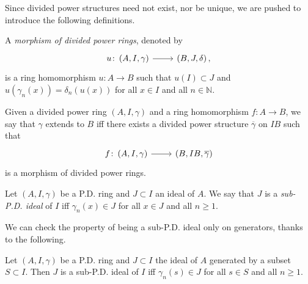 \noindent
Since divided power structures need not exist, nor be unique, we are pushed to
introduce the following definitions.
\begin{defn}
	A \emph{morphism of divided power rings}, denoted by
	\begin{equation*}
	\begin{tikzcd}[row sep = 0ex
		,/tikz/column 1/.append style={anchor=base east}
		,/tikz/column 2/.append style={anchor=base west}]
		u\colon \left(A, I, \gamma\right) 
		\arrow[r, "", rightarrow] &
		\left(B, J, \delta\right)
	,\end{tikzcd}
	\end{equation*} 
	is a ring homomorphism $u\colon A \to B$ such that
	$u(I) \subset J$ and $u(\gamma_n(x)) = \delta_n(u(x))$
	for all $x \in I$ and all $n \in \mathbb{N}$.
\end{defn}


\begin{defn}[]\label{RingExtendingDivPowers}
	Given a divided power ring $\left(A, I, \gamma\right)$ and
	a ring homomorphism $f\colon A \to B$, we say that
	$\gamma$ extends to $B$ iff there exists a divided power
	structure $\overline{\gamma}$ on $IB$ such that
	\begin{equation*}
	\begin{tikzcd}[row sep = 0ex
			,/tikz/column 1/.append style={anchor=base east}
			,/tikz/column 2/.append style={anchor=base west}]
			f\colon 
			\left(A, I, \gamma\right)
			\arrow[r, "", rightarrow] &
			\left(B, IB, \overline{\gamma}\right)
	\end{tikzcd}
	\end{equation*} 
	is a morphism of divided power rings.
\end{defn}


\begin{defn}
	Let $\left(A, I, \gamma\right)$ be a P.D. ring and $J \subset I$ an ideal of $A$.
	We say that $J$ is a \emph{sub-P.D. ideal} of $I$
	iff $\gamma_n(x) \in J$ for all $x \in J$
	and all $n \geq 1$.
\end{defn}


\noindent
We can check the property of being a sub-P.D. ideal only on generators, thanks to the following.
\begin{lem}
	Let $\left(A, I, \gamma\right)$ be a P.D. ring and $J \subset I$
	the ideal of $A$ generated by a subset $S \subset I$.
	Then $J$ is a sub-P.D. ideal of $I$
	iff $\gamma_n(s) \in J$ for all $s \in S$
	and all $n \geq 1$.
\end{lem}


